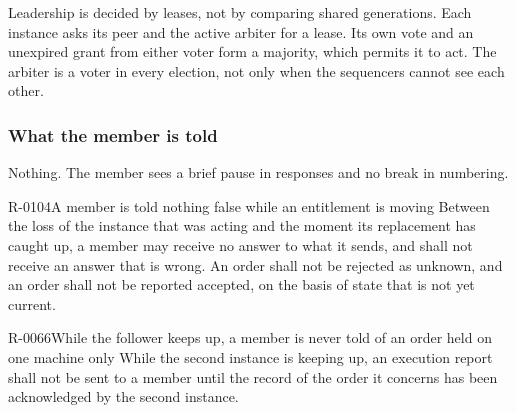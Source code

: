 Leadership is decided by leases, not by comparing shared generations. Each
instance asks its peer and the active arbiter for a lease. Its own vote and an
unexpired grant from either voter form a majority, which permits it to act. The
arbiter is a voter in every election, not only when the sequencers cannot see
each other.

\subsubsection{What the member is told}
\label{sec:ha:enabled:sequencer:member}

Nothing. The member sees a brief pause in responses and no break in numbering.

\begin{requirement}{R-0104}{A member is told nothing false while an entitlement is moving}
  Between the loss of the instance that was acting and the moment its replacement
  has caught up, a member may receive no answer to what it sends, and shall not
  receive an answer that is wrong. An order shall not be rejected as unknown, and
  an order shall not be reported accepted, on the basis of state that is not yet
  current.
\end{requirement}

\begin{requirement}{R-0066}{While the follower keeps up, a member is never told of an order held on one machine only}
  While the second instance is keeping up, an execution report shall not be sent
  to a member until the record of the order it concerns has been acknowledged by
  the second instance.
\end{requirement}

